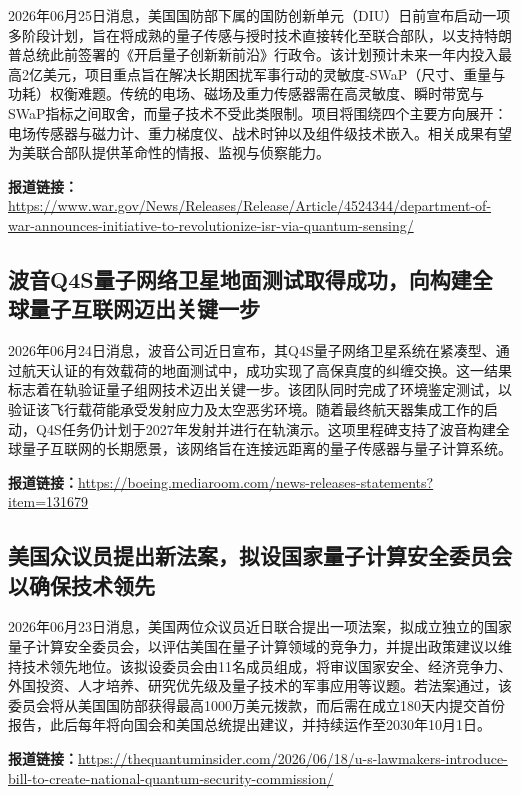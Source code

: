 \documentclass[12pt,a4paper]{ctexart}
\begin{document}
2026年06月25日消息，美国国防部下属的国防创新单元（DIU）日前宣布启动一项多阶段计划，旨在将成熟的量子传感与授时技术直接转化至联合部队，以支持特朗普总统此前签署的《开启量子创新新前沿》行政令。该计划预计未来一年内投入最高2亿美元，项目重点旨在解决长期困扰军事行动的灵敏度-SWaP（尺寸、重量与功耗）权衡难题。传统的电场、磁场及重力传感器需在高灵敏度、瞬时带宽与SWaP指标之间取舍，而量子技术不受此类限制。项目将围绕四个主要方向展开：电场传感器与磁力计、重力梯度仪、战术时钟以及组件级技术嵌入。相关成果有望为美联合部队提供革命性的情报、监视与侦察能力。

\noindent\textbf{报道链接：}\url{https://www.war.gov/News/Releases/Release/Article/4524344/department-of-war-announces-initiative-to-revolutionize-isr-via-quantum-sensing/}

\subsection{ 波音Q4S量子网络卫星地面测试取得成功，向构建全球量子互联网迈出关键一步 }

2026年06月24日消息，波音公司近日宣布，其Q4S量子网络卫星系统在紧凑型、通过航天认证的有效载荷的地面测试中，成功实现了高保真度的纠缠交换。这一结果标志着在轨验证量子组网技术迈出关键一步。该团队同时完成了环境鉴定测试，以验证该飞行载荷能承受发射应力及太空恶劣环境。随着最终航天器集成工作的启动，Q4S任务仍计划于2027年发射并进行在轨演示。这项里程碑支持了波音构建全球量子互联网的长期愿景，该网络旨在连接远距离的量子传感器与量子计算系统。

\noindent\textbf{报道链接：}\url{https://boeing.mediaroom.com/news-releases-statements?item=131679}

\subsection{ 美国众议员提出新法案，拟设国家量子计算安全委员会以确保技术领先 }

2026年06月23日消息，美国两位众议员近日联合提出一项法案，拟成立独立的国家量子计算安全委员会，以评估美国在量子计算领域的竞争力，并提出政策建议以维持技术领先地位。该拟设委员会由11名成员组成，将审议国家安全、经济竞争力、外国投资、人才培养、研究优先级及量子技术的军事应用等议题。若法案通过，该委员会将从美国国防部获得最高1000万美元拨款，而后需在成立180天内提交首份报告，此后每年将向国会和美国总统提出建议，并持续运作至2030年10月1日。

\noindent\textbf{报道链接：}\url{https://thequantuminsider.com/2026/06/18/u-s-lawmakers-introduce-bill-to-create-national-quantum-security-commission/}
\end{document}
